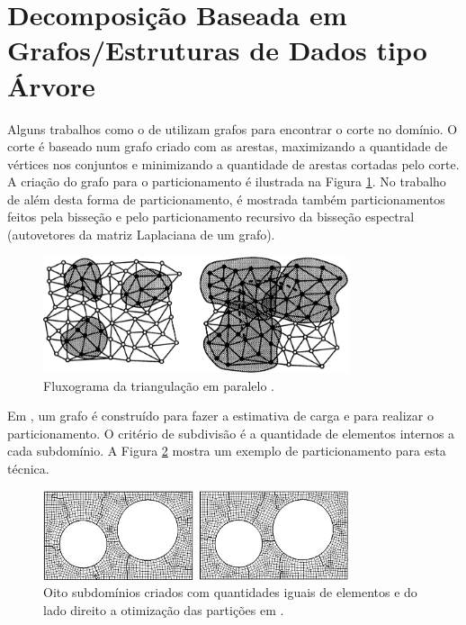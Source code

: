  
\section{Decomposição Baseada em Grafos/Estruturas de Dados tipo Árvore} \label{sec:decomposição_est_dados}


Alguns trabalhos como o de \cite{bib:BARNARD94} utilizam grafos para encontrar o corte no domínio. O corte é baseado num grafo criado com as arestas, maximizando a quantidade de vértices nos conjuntos e minimizando a quantidade de arestas cortadas pelo corte. A criação do grafo para o particionamento é ilustrada na Figura \ref{fig:barnard}. No trabalho de \cite{bib:SIMON91} além desta forma de particionamento, é mostrada também particionamentos feitos pela bisseção e pelo particionamento recursivo da bisseção espectral (autovetores da matriz Laplaciana de um grafo).


\begin{figure}[htbp]
  \centering
  \includegraphics[width=0.8\textwidth]{fig/barnard.png}
   \caption{ Fluxograma da triangulação em paralelo \cite{bib:BARNARD94}.}
  \label{fig:barnard}
\end{figure}


Em \cite{bib:NIKISHKOV99}, um grafo é construído para fazer a estimativa de carga e para realizar o particionamento. O critério de subdivisão é a quantidade de elementos internos a cada subdomínio. A Figura \ref{fig:nikishkov} mostra um exemplo de particionamento para esta técnica.

\begin{figure}[htbp]
  \centering
  \includegraphics[width=0.8\textwidth]{fig/nikishkov.png}
   \caption{Oito subdomínios criados com quantidades iguais de elementos e do lado direito a otimização das partições em \cite{bib:NIKISHKOV99}. }
  \label{fig:nikishkov}
\end{figure}


